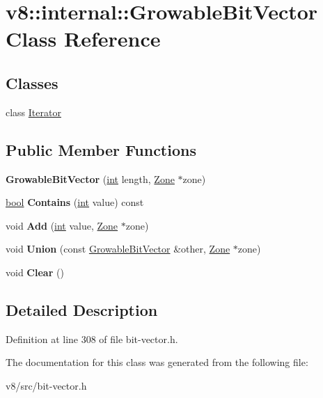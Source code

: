 \hypertarget{classv8_1_1internal_1_1GrowableBitVector}{}\section{v8\+:\+:internal\+:\+:Growable\+Bit\+Vector Class Reference}
\label{classv8_1_1internal_1_1GrowableBitVector}
\subsection*{Classes}
\begin{DoxyCompactItemize}
\item 
class \mbox{\hyperlink{classv8_1_1internal_1_1GrowableBitVector_1_1Iterator}{Iterator}}
\end{DoxyCompactItemize}
\subsection*{Public Member Functions}
\begin{DoxyCompactItemize}
\item 
\mbox{\label{classv8_1_1internal_1_1GrowableBitVector_ab29d9332ca28c6cb42501132d897a14b}} 
{\bfseries Growable\+Bit\+Vector} (\mbox{\hyperlink{classint}{int}} length, \mbox{\hyperlink{classv8_1_1internal_1_1Zone}{Zone}} $\ast$zone)
\item 
\mbox{\label{classv8_1_1internal_1_1GrowableBitVector_a732a165416dc0f1512509ca41027606b}} 
\mbox{\hyperlink{classbool}{bool}} {\bfseries Contains} (\mbox{\hyperlink{classint}{int}} value) const
\item 
\mbox{\label{classv8_1_1internal_1_1GrowableBitVector_ab6355b8c195d49203dc2f78e31505677}} 
void {\bfseries Add} (\mbox{\hyperlink{classint}{int}} value, \mbox{\hyperlink{classv8_1_1internal_1_1Zone}{Zone}} $\ast$zone)
\item 
\mbox{\label{classv8_1_1internal_1_1GrowableBitVector_a5b0fe759972e9aa4de501d3f2fc06795}} 
void {\bfseries Union} (const \mbox{\hyperlink{classv8_1_1internal_1_1GrowableBitVector}{Growable\+Bit\+Vector}} \&other, \mbox{\hyperlink{classv8_1_1internal_1_1Zone}{Zone}} $\ast$zone)
\item 
\mbox{\label{classv8_1_1internal_1_1GrowableBitVector_a417bc6a638e1cc950c571d7ff7208703}} 
void {\bfseries Clear} ()
\end{DoxyCompactItemize}


\subsection{Detailed Description}


Definition at line 308 of file bit-\/vector.\+h.



The documentation for this class was generated from the following file\+:\begin{DoxyCompactItemize}
\item 
v8/src/bit-\/vector.\+h\end{DoxyCompactItemize}
